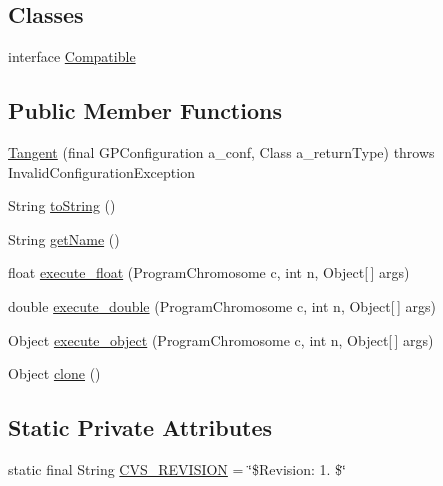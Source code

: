 \subsection*{Classes}
\begin{DoxyCompactItemize}
\item 
interface \hyperlink{interfaceorg_1_1jgap_1_1gp_1_1function_1_1_tangent_1_1_compatible}{Compatible}
\end{DoxyCompactItemize}
\subsection*{Public Member Functions}
\begin{DoxyCompactItemize}
\item 
\hyperlink{classorg_1_1jgap_1_1gp_1_1function_1_1_tangent_ad8ab870282b2ba014e490864dcfc4fc0}{Tangent} (final G\-P\-Configuration a\-\_\-conf, Class a\-\_\-return\-Type)  throws Invalid\-Configuration\-Exception 
\item 
String \hyperlink{classorg_1_1jgap_1_1gp_1_1function_1_1_tangent_abe2880f21b1708e7f18aeee7bc0307eb}{to\-String} ()
\item 
String \hyperlink{classorg_1_1jgap_1_1gp_1_1function_1_1_tangent_a45679b843971c29cc427605b3367ab7b}{get\-Name} ()
\item 
float \hyperlink{classorg_1_1jgap_1_1gp_1_1function_1_1_tangent_ac677b5dbe324d05c2736b6e6b7d08233}{execute\-\_\-float} (Program\-Chromosome c, int n, Object\mbox{[}$\,$\mbox{]} args)
\item 
double \hyperlink{classorg_1_1jgap_1_1gp_1_1function_1_1_tangent_a64b064978e60813040db6042604eb348}{execute\-\_\-double} (Program\-Chromosome c, int n, Object\mbox{[}$\,$\mbox{]} args)
\item 
Object \hyperlink{classorg_1_1jgap_1_1gp_1_1function_1_1_tangent_af3443fcea6ef225d40da846f0cbcfdd3}{execute\-\_\-object} (Program\-Chromosome c, int n, Object\mbox{[}$\,$\mbox{]} args)
\item 
Object \hyperlink{classorg_1_1jgap_1_1gp_1_1function_1_1_tangent_a8bc232ad774326514155c7e910b407ef}{clone} ()
\end{DoxyCompactItemize}
\subsection*{Static Private Attributes}
\begin{DoxyCompactItemize}
\item 
static final String \hyperlink{classorg_1_1jgap_1_1gp_1_1function_1_1_tangent_a9a1e03015bb5b21cf049d19f2ec030ee}{C\-V\-S\-\_\-\-R\-E\-V\-I\-S\-I\-O\-N} = \char`\"{}\$Revision\-: 1. \$\char`\"{}
\end{DoxyCompactItemize}
